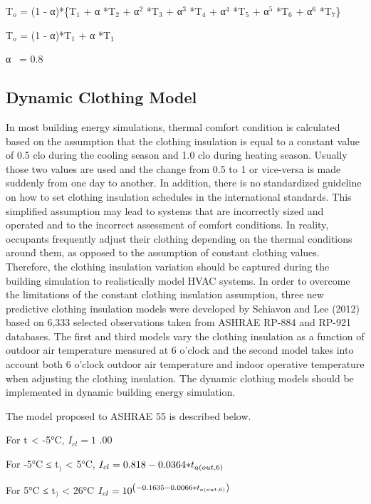 T\(_{o}\) = (1 - α)*\{T\(_{1}\) + α *T\(_{2}\) + α\(^{2}\) *T\(_{3}\) + α\(^{3}\) *T\(_{4}\) + α\(^{4}\) *T\(_{5}\) + α\(^{5}\) *T\(_{6}\) + α\(^{6}\) *T\(_{7}\)\}

T\(_{o}\) = (1 - α)*T\(_{1}\) + α *T\(_{1}\)

α~ = 0.8

\subsection{Dynamic Clothing Model}\label{dynamic-clothing-model}

In most building energy simulations, thermal comfort condition is calculated based on the assumption that the clothing insulation is equal to a constant value of 0.5 clo during the cooling season and 1.0 clo during heating season. Usually those two values are used and the change from 0.5 to 1 or vice-versa is made suddenly from one day to another. In addition, there is no standardized guideline on how to set clothing insulation schedules in the international standards. This simplified assumption may lead to systems that are incorrectly sized and operated and to the incorrect assessment of comfort conditions. In reality, occupants frequently adjust their clothing depending on the thermal conditions around them, as opposed to the assumption of constant clothing values. Therefore, the clothing insulation variation should be captured during the building simulation to realistically model HVAC systems. In order to overcome the limitations of the constant clothing insulation assumption, three new predictive clothing insulation models were developed by Schiavon and Lee (2012) based on 6,333 selected observations taken from ASHRAE RP-884 and RP-921 databases. The first and third models vary the clothing insulation as a function of outdoor air temperature measured at 6 o'clock and the second model takes into account both 6 o'clock outdoor air temperature and indoor operative temperature when adjusting the clothing insulation. The dynamic clothing models should be implemented in dynamic building energy simulation.

The model proposed to ASHRAE 55 is described below.

For t\(_{ }\) \textless{} -5°C, \({I_{cl}} = 1\) .00

For -5°C ≤ t\(_{)}\) \textless{} 5°C, \({I_{cl}} = 0.818 - 0.0364{\rm{*}}{t_{a\left( {out,6} \right)}}\)

For 5°C ≤ t\(_{)}\) \textless{} 26°C \({I_{cl}} = {10^{\left( { - 0.1635 - 0.0066{\rm{*}}{t_{a\left( {out,6} \right)}}} \right)}}\)

